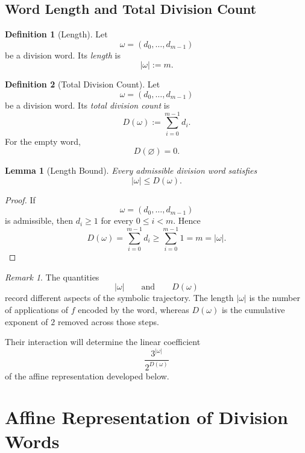 \documentclass[12pt, oneside]{article}
\numberwithin{equation}{section}
\theoremstyle{definition}
\newtheorem{definition}{Definition}[section]
\theoremstyle{plain}
\newtheorem{lemma}[theorem]{Lemma}
\theoremstyle{remark}
\newtheorem*{remark}{Remark}
\begin{document}
\subsection{Word Length and Total Division Count}

\begin{definition}[Length]
Let
\[
\omega=(d_0,\ldots,d_{m-1})
\]
be a division word. Its \emph{length} is
\[
|\omega|:=m.
\]
\end{definition}

\begin{definition}[Total Division Count]
Let
\[
\omega=(d_0,\ldots,d_{m-1})
\]
be a division word. Its \emph{total division count} is
\[
D(\omega):=\sum_{i=0}^{m-1}d_i.
\]
For the empty word,
\[
D(\varnothing)=0.
\]
\end{definition}

\begin{lemma}[Length Bound]
Every admissible division word satisfies
\[
|\omega|\le D(\omega).
\]
\end{lemma}

\begin{proof}
If
\[
\omega=(d_0,\ldots,d_{m-1})
\]
is admissible, then \(d_i\ge1\) for every \(0\le i<m\). Hence
\[
D(\omega)
=
\sum_{i=0}^{m-1}d_i
\ge
\sum_{i=0}^{m-1}1
=
m
=
|\omega|.
\]
\end{proof}

\begin{remark}
The quantities
\[
|\omega|
\qquad\text{and}\qquad
D(\omega)
\]
record different aspects of the symbolic trajectory. The length
\(|\omega|\) is the number of applications of \(f\) encoded by the word,
whereas \(D(\omega)\) is the cumulative exponent of \(2\) removed across
those steps.

Their interaction will determine the linear coefficient
\[
\frac{3^{|\omega|}}{2^{D(\omega)}}
\]
of the affine representation developed below.
\end{remark}


\section{Affine Representation of Division Words}
\label{sec:affine-representation}

\end{document}
